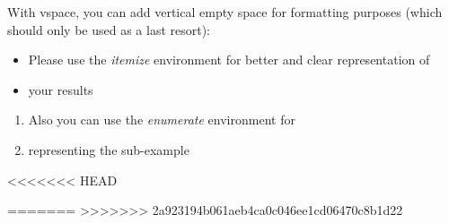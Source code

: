 \documentclass[parskip=full]{scrartcl}
\begin{document}
With vspace, you can add vertical empty space for formatting purposes (which should only be used as a last resort):
\vspace*{1cm}
\begin{itemize}
	\item Please use the \textit{itemize} environment for better and clear representation of
	\item your results
\end{itemize}

\begin{enumerate}
	\item Also you can use the \textit{enumerate} environment for 
	\item representing the sub-example
\end{enumerate}

<<<<<<< HEAD


=======
\printbibliography
>>>>>>> 2a923194b061aeb4ca0c046ee1cd06470c8b1d22
\end{document}
